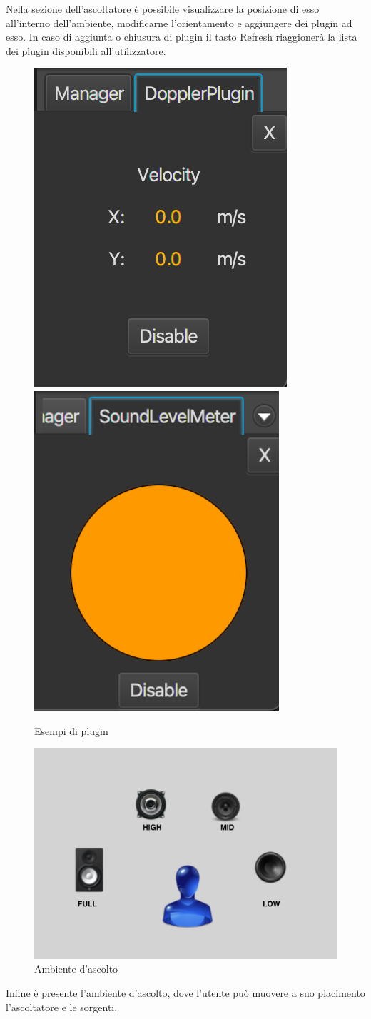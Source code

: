 \documentclass[a4paper,12pt]{report}
\begin{document}
%
Nella sezione dell'ascoltatore è possibile visualizzare la posizione di esso all'interno dell'ambiente, modificarne l'orientamento e aggiungere dei plugin ad esso. In caso di aggiunta o chiusura di plugin il tasto Refresh riaggionerà la lista dei plugin disponibili all'utilizzatore.
%
\begin{figure}[H]
\centering{}
\includegraphics[height=.5\textwidth]{img/guide/plugin1.png}
\includegraphics[height=.5\textwidth]{img/guide/plugin2.png}
\caption{Esempi di plugin}
\label{img:plugins}
\end{figure}
%
\begin{figure}[H]
\centering{}
\includegraphics[width=.75\textwidth]{img/guide/environment.png}
\caption{Ambiente d'ascolto}
\label{img:environment}
\end{figure}
%
Infine è presente l'ambiente d'ascolto, dove l'utente può muovere a suo piacimento l'ascoltatore e le sorgenti.
%
\end{document}
